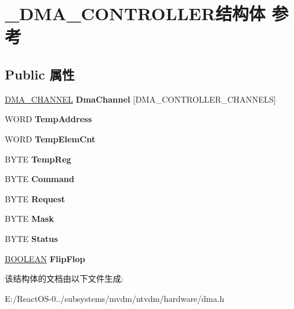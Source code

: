 \hypertarget{struct___d_m_a___c_o_n_t_r_o_l_l_e_r}{}\section{\+\_\+\+D\+M\+A\+\_\+\+C\+O\+N\+T\+R\+O\+L\+L\+E\+R结构体 参考}
\label{struct___d_m_a___c_o_n_t_r_o_l_l_e_r}
\subsection*{Public 属性}
\begin{DoxyCompactItemize}
\item 
\mbox{\label{struct___d_m_a___c_o_n_t_r_o_l_l_e_r_a142e30490b7d0683653db8f98ce94604}} 
\hyperlink{struct___d_m_a___c_h_a_n_n_e_l}{D\+M\+A\+\_\+\+C\+H\+A\+N\+N\+EL} {\bfseries Dma\+Channel} \mbox{[}D\+M\+A\+\_\+\+C\+O\+N\+T\+R\+O\+L\+L\+E\+R\+\_\+\+C\+H\+A\+N\+N\+E\+LS\mbox{]}
\item 
\mbox{\label{struct___d_m_a___c_o_n_t_r_o_l_l_e_r_adea08db95885af3b05041e8698590a2d}} 
W\+O\+RD {\bfseries Temp\+Address}
\item 
\mbox{\label{struct___d_m_a___c_o_n_t_r_o_l_l_e_r_a6692d11f5a85d3cf00bf8e5794e33831}} 
W\+O\+RD {\bfseries Temp\+Elem\+Cnt}
\item 
\mbox{\label{struct___d_m_a___c_o_n_t_r_o_l_l_e_r_a5a66f64ab883c093e8aada20d149cce9}} 
B\+Y\+TE {\bfseries Temp\+Reg}
\item 
\mbox{\label{struct___d_m_a___c_o_n_t_r_o_l_l_e_r_a086f70025f19adf057dc25076a90431c}} 
B\+Y\+TE {\bfseries Command}
\item 
\mbox{\label{struct___d_m_a___c_o_n_t_r_o_l_l_e_r_a205c33e06d2cf48f9d6abed4bb78e04e}} 
B\+Y\+TE {\bfseries Request}
\item 
\mbox{\label{struct___d_m_a___c_o_n_t_r_o_l_l_e_r_a5dd8820fee85bafbd687723196f1c081}} 
B\+Y\+TE {\bfseries Mask}
\item 
\mbox{\label{struct___d_m_a___c_o_n_t_r_o_l_l_e_r_a989b19df633aaea58db9b3afd31f0f43}} 
B\+Y\+TE {\bfseries Status}
\item 
\mbox{\label{struct___d_m_a___c_o_n_t_r_o_l_l_e_r_a656d617eb55ce6d6fc3a5798241ddb77}} 
\hyperlink{_processor_bind_8h_a112e3146cb38b6ee95e64d85842e380a}{B\+O\+O\+L\+E\+AN} {\bfseries Flip\+Flop}
\end{DoxyCompactItemize}


该结构体的文档由以下文件生成\+:\begin{DoxyCompactItemize}
\item 
E\+:/\+React\+O\+S-\/0../subsystems/mvdm/ntvdm/hardware/dma.\+h\end{DoxyCompactItemize}
